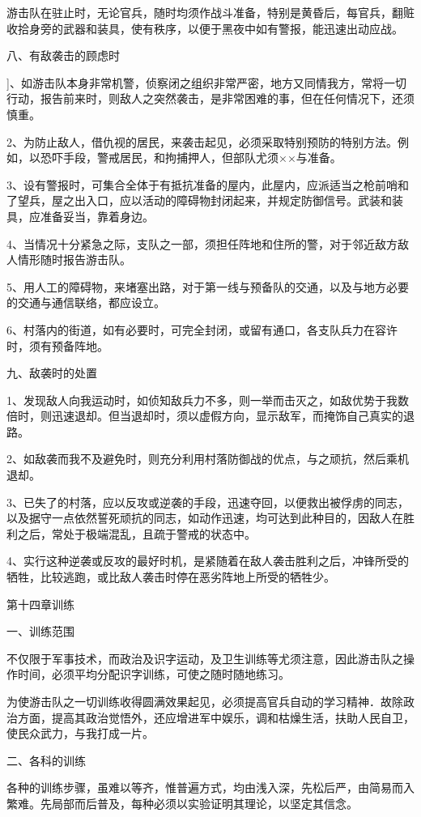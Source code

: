 游击队在驻止时，无论官兵，随时均须作战斗准备，特别是黄昏后，每官兵，翻赃收拾身旁的武器和装具，使有秩序，以便于黑夜中如有警报，能迅速出动应战。

八、有敌袭击的顾虑时

]、如游击队本身非常机警，侦察闭之组织非常严密，地方又同情我方，常将一切行动，报告前来时，则敌人之突然袭击，是非常困难的事，但在任何情况下，还须慎重。

2、为防止敌人，借仇视的居民，来袭击起见，必须采取特别预防的特别方法。例如，以恐吓手段，警戒居民，和拘捕押人，但部队尤须××与准备。

3、设有警报时，可集合全体于有抵抗准备的屋内，此屋内，应派适当之枪前哨和了望兵，屋之出入口，应以活动的障碍物封闭起来，并规定防御信号。武装和装具，应准备妥当，靠着身边。

4、当情况十分紧急之际，支队之一部，须担任阵地和住所的警，对于邻近敌方敌人情形随时报告游击队。

5、用人工的障碍物，来堵塞出路，对于第一线与预备队的交通，以及与地方必要的交通与通信联络，都应设立。

6、村落内的街道，如有必要时，可完全封闭，或留有通口，各支队兵力在容许时，须有预备阵地。

九、敌袭时的处置

1、发现敌人向我运动时，如侦知敌兵力不多，则一举而击灭之，如敌优势于我数倍时，则迅速退却。但当退却时，须以虚假方向，显示敌军，而掩饰自己真实的退路。

2、如敌袭而我不及避免时，则充分利用村落防御战的优点，与之顽抗，然后乘机退却。

3、已失了的村落，应以反攻或逆袭的手段，迅速夺回，以便救出被俘虏的同志，以及据守一点依然誓死顽抗的同志，如动作迅速，均可达到此种目的，因敌人在胜利之后，常处于极端混乱，且疏于警戒的状态中。

4、实行这种逆袭或反攻的最好时机，是紧随着在敌人袭击胜利之后，冲锋所受的牺牲，比较逃跑，或比敌人袭击时停在恶劣阵地上所受的牺牲少。

第十四章训练

一、训练范围

不仅限于军事技术，而政治及识字运动，及卫生训练等尤须注意，因此游击队之操作时间，必须平均分配识字训练，可使之随时随地练习。

为使游击队之一切训练收得圆满效果起见，必须提高官兵自动的学习精神．故除政治方面，提高其政治觉悟外，还应增进军中娱乐，调和枯燥生活，扶助人民自卫，使民众武力，与我打成一片。

二、各科的训练

各种的训练步骤，虽难以等齐，惟普遍方式，均由浅入深，先松后严，由简易而入繁难。先局部而后普及，每种必须以实验证明其理论，以坚定其信念。

